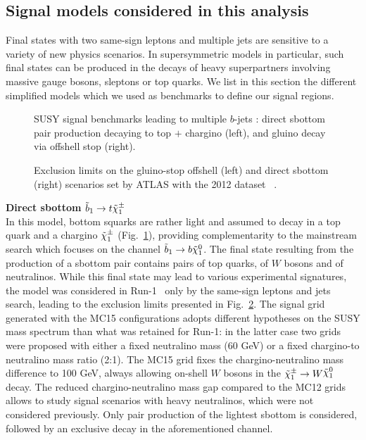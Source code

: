 \subsection{Signal models considered in this analysis}
\label{subsec:signal_models}
Final states with two same-sign leptons and multiple jets are sensitive to a variety of new physics scenarios. 
In supersymmetric models in particular, such final states can be produced in the decays of heavy superpartners 
involving massive gauge bosons, sleptons or top quarks. 
We list in this section the different simplified models which we used as benchmarks to define our signal regions. 

\begin{figure}[htb!]
\centering
{}
\hspace{3cm}
\caption{SUSY signal benchmarks leading to multiple $b$-jets : 
direct sbottom pair production decaying to top $+$ chargino (left), and gluino decay via offshell stop (right).}
\label{fig:feynman_3rdgen}
\end{figure}

\begin{figure}[t]
\centering
{}
\caption{Exclusion limits on the gluino-stop offshell (left) and direct sbottom (right) scenarios 
set by ATLAS with the 2012 dataset~%
.}
\label{fig:run1excl_3rdgen}
\end{figure}


\par{\bf Direct sbottom $\sbot\to t\chargino$\\}
In this model, bottom squarks are rather light and assumed to decay in a top quark and a chargino $\tilde{\chi}_{1}^{\pm}$ (Fig.~\ref{fig:feynman_3rdgen}), 
providing complementarity to the mainstream search which focuses on the channel $\sbot\to b\neut$. 
The final state resulting from the production of a sbottom pair contains pairs of top quarks, of $W$ bosons and of neutralinos. 
While this final state may lead to various experimental signatures, 
the model was considered in Run-1~%
only by the same-sign leptons and jets search, leading to the exclusion limits presented in Fig.~\ref{fig:run1excl_3rdgen}. 
The signal grid generated with the MC15 configurations adopts different hypotheses on the SUSY mass spectrum than what was retained for Run-1: 
in the latter case two grids were proposed with either a fixed neutralino mass (60 GeV) or a fixed chargino-to neutralino mass ratio (2:1). 
The MC15 grid fixes the chargino-neutralino mass difference to 100 GeV, always allowing on-shell $W$ bosons in the $\chargino\to W\ninoone$ decay. 
The reduced chargino-neutralino mass gap compared to the MC12 grids allows to study signal scenarios with heavy neutralinos, which were not considered previously. 
Only pair production of the lightest sbottom is considered, followed by an exclusive decay in the aforementioned channel. \\

